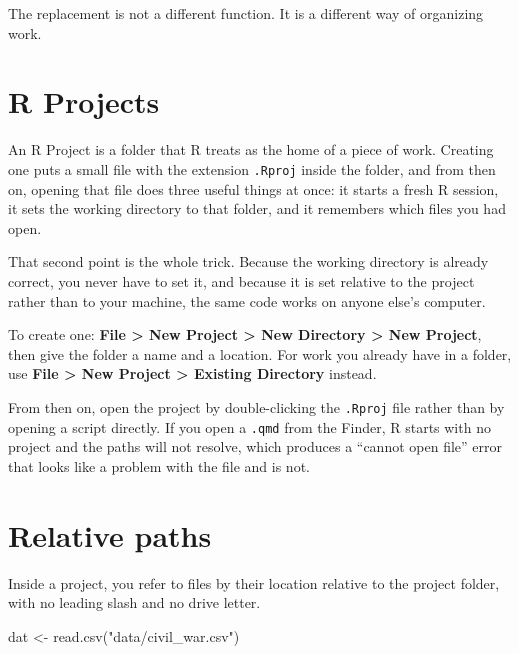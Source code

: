 \documentclass[
  a4paper,
]{scrbook}
\newenvironment{Shaded}{\begin{snugshade}}{\end{snugshade}}
\newcommand{\FunctionTok}[1]{\textcolor[rgb]{0.28,0.35,0.67}{#1}}
\newcommand{\NormalTok}[1]{\textcolor[rgb]{0.00,0.23,0.31}{#1}}
\newcommand{\OtherTok}[1]{\textcolor[rgb]{0.00,0.23,0.31}{#1}}
\newcommand{\StringTok}[1]{\textcolor[rgb]{0.13,0.47,0.30}{#1}}
\begin{document}
The replacement is not a different function. It is a different way of
organizing work.

\section*{R Projects}\label{r-projects}


An R Project is a folder that R treats as the home of a piece of work.
Creating one puts a small file with the extension \texttt{.Rproj} inside
the folder, and from then on, opening that file does three useful things
at once: it starts a fresh R session, it sets the working directory to
that folder, and it remembers which files you had open.

That second point is the whole trick. Because the working directory is
already correct, you never have to set it, and because it is set
relative to the project rather than to your machine, the same code works
on anyone else's computer.

To create one: \textbf{File \textgreater{} New Project \textgreater{}
New Directory \textgreater{} New Project}, then give the folder a name
and a location. For work you already have in a folder, use \textbf{File
\textgreater{} New Project \textgreater{} Existing Directory} instead.

From then on, open the project by double-clicking the \texttt{.Rproj}
file rather than by opening a script directly. If you open a
\texttt{.qmd} from the Finder, R starts with no project and the paths
will not resolve, which produces a ``cannot open file'' error that looks
like a problem with the file and is not.

\section*{Relative paths}\label{relative-paths}


Inside a project, you refer to files by their location relative to the
project folder, with no leading slash and no drive letter.

\begin{Shaded}
\begin{Highlighting}[]
\NormalTok{dat }\OtherTok{\textless{}{-}} \FunctionTok{read.csv}\NormalTok{(}\StringTok{"data/civil\_war.csv"}\NormalTok{)}
\end{Highlighting}
\end{Shaded}
\end{document}
